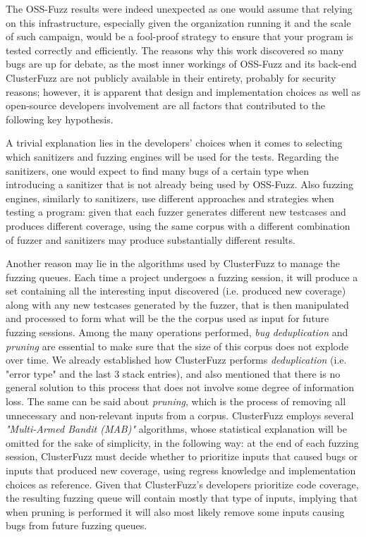 The OSS-Fuzz results were indeed unexpected as one would assume that relying on this infrastructure, especially given the organization running it and the scale of such campaign, would be a fool-proof strategy to ensure that your program is tested correctly and efficiently. The reasons why this work discovered so many bugs are up for debate, as the most inner workings of OSS-Fuzz and its back-end ClusterFuzz are not publicly available in their entirety, probably for security reasons; however, it is apparent that design and implementation choices as well as open-source developers involvement are all factors that contributed to the following key hypothesis.

A trivial explanation lies in the developers' choices when it comes to selecting which sanitizers and fuzzing engines will be used for the tests. Regarding the sanitizers, one would expect to find many bugs of a certain type when introducing a sanitizer that is not already being used by OSS-Fuzz. Also fuzzing engines, similarly to sanitizers, use different approaches and strategies when testing a program: given that each fuzzer generates different new testcases and produces different coverage, using the same corpus with a different combination of fuzzer and sanitizers may produce substantially different results. 

Another reason may lie in the algorithms used by ClusterFuzz to manage the fuzzing queues. Each time a project undergoes a fuzzing session, it will produce a set containing all the interesting input discovered (i.e. produced new coverage) along with any new testcases generated by the fuzzer, that is then manipulated and processed to form what will be the the corpus used as input for future fuzzing sessions. Among the many operations performed, \textit{bug deduplication} and \textit{pruning} are essential to make sure that the size of this corpus does not explode over time. We already established how ClusterFuzz performs \textit{deduplication} (i.e. "error type" and the last 3 stack entries), and also mentioned that there is no general solution to this process that does not involve some degree of information loss.
The same can be said about \textit{pruning}, which is the process of removing all unnecessary and non-relevant inputs from a corpus. ClusterFuzz employs several \textit{"Multi-Armed Bandit (MAB)"} \cite{mab} algorithms, whose statistical explanation will be omitted for the sake of simplicity, in the following way: at the end of each fuzzing session, ClusterFuzz must decide whether to prioritize inputs that caused bugs or inputs that produced new coverage, using regress knowledge and implementation choices as reference. Given that ClusterFuzz's developers prioritize code coverage, the resulting fuzzing queue will contain mostly that type of inputs, implying that when pruning is performed it will also most likely remove some inputs causing bugs from future fuzzing queues.

